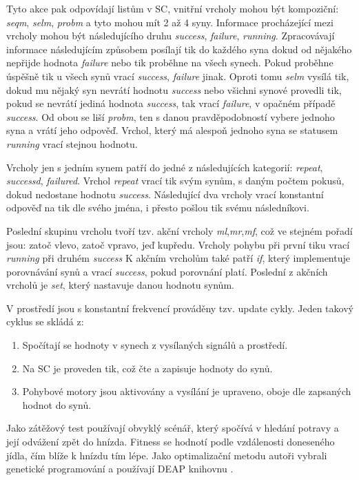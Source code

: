 \par
Tyto akce pak odpovídají listům v SC, vnitřní vrcholy mohou být kompoziční: \textit{seqm}, \textit{selm}, \textit{probm} a tyto mohou mít 2 až 4 syny. Informace procházející mezi vrcholy mohou být následujícího druhu \textit{success}, \textit{failure}, \textit{running}. Zpracovávají informace následujícím způsobem posílají tik do každého syna dokud od nějakého nepřijde hodnota \textit{failure} nebo tik proběhne na všech synech. Pokud proběhne úspěšně tik u všech synů vrací \textit{success}, \textit{failure} jinak. Oproti tomu \textit{selm} vysílá tik, dokud mu nějaký syn nevrátí hodnotu \textit{success} nebo všichni synové provedli tik, pokud se nevrátí jediná hodnota \textit{success}, tak vrací \textit{failure}, v opačném případě \textit{success}. Od obou se liší \textit{probm}, ten s danou pravděpodobností vybere jednoho syna a vrátí jeho odpověď. Vrchol, který má alespoň jednoho syna se statusem \textit{running} vrací stejnou hodnotu. \par
Vrcholy jen s jedním synem patří do jedné z následujících kategorií: \textit{repeat}, \textit{successd}, \textit{failured}. Vrchol \textit{repeat} vrací tik svým synům, s daným počtem pokusů, dokud nedostane hodnotu \textit{success}. Následující dva vrcholy vrací konstantní odpověď na tik dle svého jména, i přesto pošlou tik svému následníkovi. \par
Poslední skupinu vrcholu tvoří tzv. akční vrcholy \textit{ml},\textit{mr},\textit{mf}, což ve stejném pořadí jsou: zatoč vlevo, zatoč vpravo, jeď kupředu. Vrcholy pohybu při první tiku vrací \textit{running} při druhém \textit{success} K akčním vrcholům také patří \textit{if}, který implementuje porovnávání synů a vrací \textit{success}, pokud porovnání platí. Poslední z akčních vrcholů je \textit{set}, který nastavuje danou hodnotu synům. 
\par
V prostředí jsou s konstantní frekvencí prováděny tzv. update cykly. Jeden takový cyklus se skládá z: 
\par
\begin{enumerate}
    \item Spočítají se hodnoty v synech z vysílaných signálů a prostředí. 
    \item Na SC je proveden tik, což čte a zapisuje hodnoty do synů. 
    \item Pohybové motory jsou aktivovány a vysílání je upraveno, oboje dle zapsaných hodnot do synů.
\end{enumerate}
\par 
Jako zátěžový test používají obvyklý scénář, který spočívá v hledání potravy a její odvážení zpět do hnízda. Fitness se hodnotí podle vzdálenosti doneseného jídla, čím blíže k hnízdu tím lépe. Jako optimalizační metodu autoři vybrali genetické programování a používají DEAP knihovnu \cite{deap}. \
